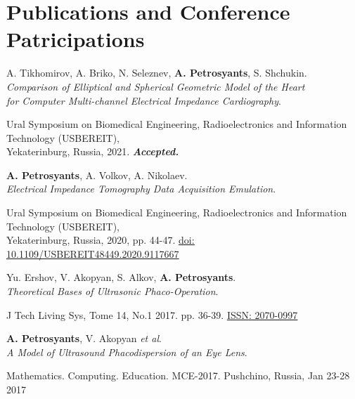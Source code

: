 \section{Publications and Conference Patricipations}
\resumeSubHeadingListStart
\resumeProjectHeading
  {A. Tikhomirov, A. Briko, N. Seleznev, \textbf{A. Petrosyants}, S. Shchukin.\\
  \textit{Comparison of Elliptical and Spherical Geometric
  Model of the Heart}\\
  \textit{for Computer Multi-channel Electrical Impedance Cardiography}.}{}
      \begin{itemize}[leftmargin=0in, label={}]
        \small{\item{
          {Ural Symposium on Biomedical Engineering, Radioelectronics and Information Technology (USBEREIT), \\ 
          Yekaterinburg, Russia, 2021.}
          {\textbf{\textit{Accepted.}}}
        }}
      \end{itemize}

\resumeProjectHeading
    {\textbf{A. Petrosyants}, A. Volkov, A. Nikolaev.\\
  \textit{Electrical Impedance Tomography Data Acquisition Emulation}.}{}
      \begin{itemize}[leftmargin=0in, label={}]
      \small{\item{
        {Ural Symposium on Biomedical Engineering, Radioelectronics and Information Technology (USBEREIT), \\ 
              Yekaterinburg, Russia, 2020, pp. 44-47.}
        {\href{https://ieeexplore.ieee.org/abstract/document/9117667/}{\underline{doi: 10.1109/USBEREIT48449.2020.9117667}}}
      }}
      \end{itemize}

  \resumeProjectHeading
      {Yu. Ershov, V. Akopyan, S. Alkov, \textbf{A. Petrosyants}.\\
    \textit{Theoretical Bases of Ultrasonic Phaco-Operation}.}{}
        \begin{itemize}[leftmargin=0in, label={}]
        \small{\item{ 
          {J Tech Living Sys, Tome 14, No.1 2017. pp. 36-39. \href{https://www.elibrary.ru/item.asp?id=29715174}{\underline{ISSN: 2070-0997}}}
            }}
      \end{itemize}

  \resumeProjectHeading
    {\textbf{A. Petrosyants}, V. Akopyan \textit{et al}.\\
  \textit{A Model of Ultrasound Phacodispersion of an Eye Lens}.}{}
      \begin{itemize}[leftmargin=0in, label={}]
     \small{\item{ 
              {Mathematics. Computing. Education. MCE-2017. Pushchino, Russia, Jan 23-28 2017}
      }}
      \end{itemize}

